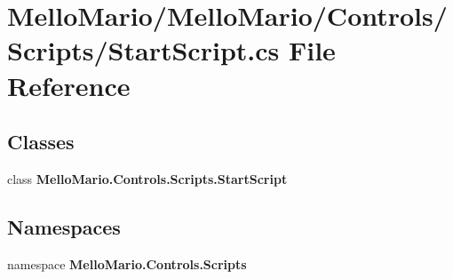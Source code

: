 \section{Mello\+Mario/\+Mello\+Mario/\+Controls/\+Scripts/\+Start\+Script.cs File Reference}
\label{StartScript_8cs}
\subsection*{Classes}
\begin{DoxyCompactItemize}
\item 
class \textbf{ Mello\+Mario.\+Controls.\+Scripts.\+Start\+Script}
\end{DoxyCompactItemize}
\subsection*{Namespaces}
\begin{DoxyCompactItemize}
\item 
namespace \textbf{ Mello\+Mario.\+Controls.\+Scripts}
\end{DoxyCompactItemize}

